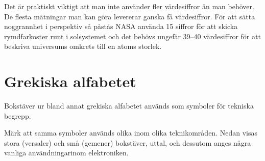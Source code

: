Det är praktiskt viktigt att man inte använder fler värdesiffror än
man behöver.  De flesta mätningar man kan göra levererar ganska få
värdesiffror.  För att sätta noggrannhet i perspektiv så påstås NASA
använda 15 siffror för att skicka rymdfarkoster runt i solsystemet och
det behövs ungefär 39--40 värdesiffror för att beskriva universums
omkrets till en atoms storlek.




\newpage
\section{Grekiska alfabetet}

Bokstäver ur bland annat grekiska alfabetet används som symboler för
tekniska begrepp.

Märk att samma symboler används olika inom olika teknikområden. Nedan
visas stora (versaler) och små (gemener) bokstäver, uttal, och
dessutom anges några vanliga användningarinom elektroniken.

